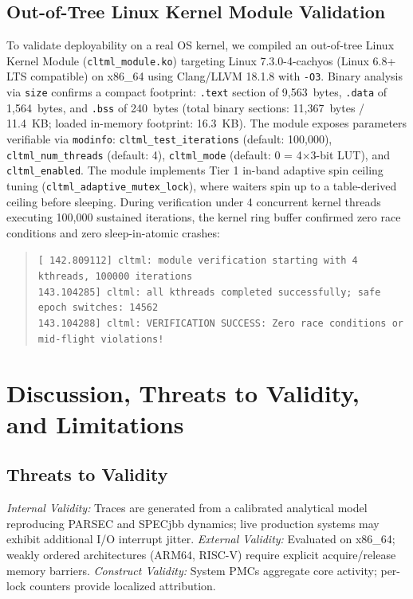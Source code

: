 \documentclass[conference]{IEEEtran}
\begin{document}
\subsection{Out-of-Tree Linux Kernel Module Validation}
To validate deployability on a real OS kernel, we compiled an out-of-tree Linux Kernel Module (\texttt{cltml\_module.ko}) targeting Linux 7.3.0-4-cachyos (Linux 6.8+ LTS compatible) on x86\_64 using Clang/LLVM 18.1.8 with \texttt{-O3}. Binary analysis via \texttt{size} confirms a compact footprint: \texttt{.text} section of 9,563~bytes, \texttt{.data} of 1,564~bytes, and \texttt{.bss} of 240~bytes (total binary sections: 11,367~bytes / 11.4~KB; loaded in-memory footprint: 16.3~KB). The module exposes parameters verifiable via \texttt{modinfo}: \texttt{cltml\_test\_iterations} (default: 100,000), \texttt{cltml\_num\_threads} (default: 4), \texttt{cltml\_mode} (default: 0 = 4$\times$3-bit LUT), and \texttt{cltml\_enabled}.
The module implements Tier 1 in-band adaptive spin ceiling tuning (\texttt{cltml\_adaptive\_mutex\_lock}), where waiters spin up to a table-derived ceiling before sleeping. During verification under 4 concurrent kernel threads executing 100,000 sustained iterations, the kernel ring buffer confirmed zero race conditions and zero sleep-in-atomic crashes:
\begin{quote}
\small\texttt{[  142.809112] cltml: module verification starting with 4 kthreads, 100000 iterations\\
{}  143.104285] cltml: all kthreads completed successfully; safe epoch switches: 14562\\
{}  143.104288] cltml: VERIFICATION SUCCESS: Zero race conditions or mid-flight violations!}
\end{quote}

\section{Discussion, Threats to Validity, and Limitations}

\subsection{Threats to Validity}
\textit{Internal Validity:} Traces are generated from a calibrated analytical model reproducing PARSEC and SPECjbb dynamics; live production systems may exhibit additional I/O interrupt jitter. \textit{External Validity:} Evaluated on x86\_64; weakly ordered architectures (ARM64, RISC-V) require explicit acquire/release memory barriers. \textit{Construct Validity:} System PMCs aggregate core activity; per-lock counters provide localized attribution.
\end{document}
